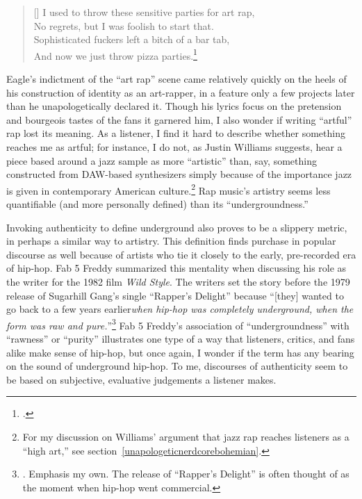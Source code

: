 \settowidth{\versewidth}{I used to throw these sensitive parties for art rap,}
    \begin{verse}[\versewidth]
        I used to throw these sensitive parties for art rap, \\
        No regrets, but I was foolish to start that. \\
        Sophisticated fuckers left a bitch of a bar tab, \\
        And now we just throw pizza parties.\footnote{
        \cite{milo2013}.}
    \end{verse}
Eagle's indictment of the ``art rap'' scene came relatively quickly on the heels of his construction of
identity as an art-rapper, in a feature only a few projects later than he unapologetically declared
it. Though his lyrics focus on the pretension and bourgeois tastes of the fans it garnered him, I also 
wonder if writing ``artful'' rap lost its meaning. As a listener, I find it hard to describe whether
something reaches me as artful; for instance, I do not, as Justin Williams suggests, hear a piece based 
around a jazz sample as more ``artistic'' than, say, something constructed from DAW-based synthesizers 
simply because of the importance jazz is given in contemporary American culture.\footnote{
    For my discussion on Williams' argument that jazz rap reaches listeners as a ``high art,'' see
    section~\ref{unapologeticnerdcorebohemian}.} 
Rap music's artistry seems less quantifiable (and more personally defined) than its ``undergroundness.''

Invoking authenticity to define underground also proves to be a slippery metric, in perhaps a similar way
to artistry. This definition finds purchase in popular discourse as well because of artists who tie it
closely to the early, pre-recorded era of hip-hop. Fab 5 Freddy summarized this mentality when discussing 
his role as the writer for the 1982 film \textit{Wild Style}. The writers set the story before the 1979
release of Sugarhill Gang's single ``Rapper's Delight'' because ``[they] wanted to go back to a few years 
earlier\textellipsis \emph{when hip-hop was completely underground, when the form was raw and pure.}''\footnote{
    \autocite[23]{justinawilliamsRhyminStealinMusical2013}. Emphasis my own. The release
    of ``Rapper's Delight'' is often thought of as the moment when hip-hop went commercial.}
Fab 5 Freddy's association of ``undergroundness'' with ``rawness'' or ``purity'' illustrates one type
of a way that listeners, critics, and fans alike make sense of hip-hop, but once again, I wonder if the
term has any bearing on the sound of underground hip-hop. To me, discourses of authenticity seem to be
based on subjective, evaluative judgements a listener makes.

